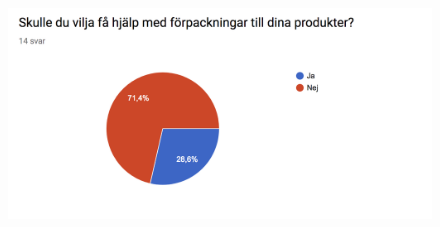 \documentclass[10pt,a4paper,oneside]{article}
\begin{document}
\begin{figure}
	\includegraphics[scale=0.6]{14.png}
\end{figure}
\end{document}
